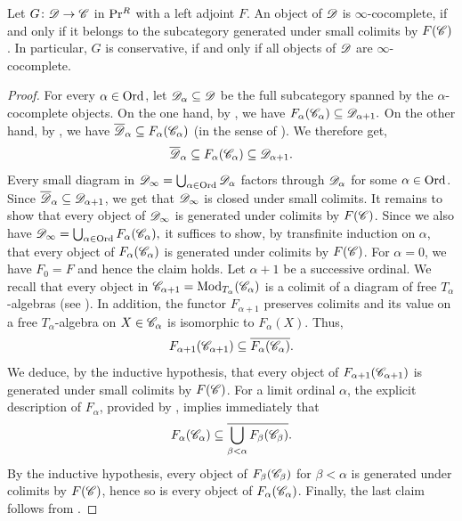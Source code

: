 \documentclass[english]{article}
\begin{document}
\begin{prop}\label{cocomplete_Is_Generated}
    Let $G\colon \mathscr{D} \to \mathscr{C}$ in $\mathrm{Pr}{}^R$ with a left adjoint $F$. An object of $\mathscr{D}$ is $\infty$-cocomplete, if and only if it belongs to the subcategory generated under small colimits by $F(\mathscr{C})$. In particular, $G$ is conservative, if and only if all objects of $\mathscr{D}$ are $\infty$-cocomplete.  
\end{prop}
\begin{proof}
    For every $\alpha \in \mathrm{Ord}$, 
    let $\mathscr{D}_{\alpha} \subseteq \mathscr{D}$ be the full subcategory spanned by the $\alpha$-cocomplete objects.
    On the one hand, by , we have $F_\alpha(\mathscr{C}_\alpha) \subseteq \mathscr{D}_{\alpha+1}.$
    On the other hand, by , we have 
    $\overline{\mathscr{D}}_\alpha \subseteq F_\alpha(\mathscr{C}_\alpha)$ (in the sense of ). 
    We therefore get,
    \[
        \overline{\mathscr{D}}_{\alpha} \subseteq 
        F_{\alpha}(\mathscr{C}_{\alpha}) \subseteq
        \mathscr{D}_{\alpha+1}.
    \]
    Every small diagram in 
    \(
        \mathscr{D}_\infty =
        \bigcup_{\alpha\in\mathrm{Ord}} \mathscr{D}_{\alpha}
    \)
    factors through $\mathscr{D}_\alpha$ for some $\alpha \in \mathrm{Ord}$. Since $\overline{\mathscr{D}}_{\alpha} \subseteq \mathscr{D}_{\alpha+1}$, we get that $\mathscr{D}_\infty$ is closed under small colimits. It remains to show that every object of $\mathscr{D}_\infty$ is generated under colimits by $F(\mathscr{C})$.
    Since we also have 
    \(
        \mathscr{D}_\infty = 
         \bigcup_{\alpha\in\mathrm{Ord}} F_\alpha(\mathscr{C}_\alpha),
    \)
    it suffices to show, by transfinite induction on $\alpha$, that every object of $F_\alpha(\mathscr{C}_\alpha)$ is generated under colimits by $F(\mathscr{C})$.
    For $\alpha=0$, we have $F_0=F$ and hence the claim holds. Let $\alpha+1$ be a successive ordinal. We recall that every object in  $\mathscr{C}_{\alpha+1}=\operatorname{\operatorname{Mod}}_{T_\alpha}(\mathscr{C}_\alpha)$
    is a colimit of a diagram of free $T_\alpha$-algebras (see ). In addition, the functor $F_{\alpha+1}$ preserves colimits and its value on a free $T_\alpha$-algebra on $X\in\mathscr{C}_\alpha$ is isomorphic to $F_\alpha(X)$. Thus,
    \[
        F_{\alpha+1}(\mathscr{C}_{\alpha+1}) \subseteq \overline{F_\alpha(\mathscr{C}_\alpha)}.
    \]
    We deduce, by the inductive hypothesis, that every object of $F_{\alpha+1}(\mathscr{C}_{\alpha+1})$ is generated under small colimits by $F(\mathscr{C})$.
    For a limit ordinal $\alpha$, the explicit description of $F_\alpha$, provided by \cite[Theorem B]{horev2017conjugates}, implies immediately that
    \[
        F_\alpha(\mathscr{C}_\alpha) \subseteq 
        \overline{\bigcup_{\beta<\alpha}F_\beta(\mathscr{C}_\beta)}.
    \]
    By the inductive hypothesis, every object of $F_\beta(\mathscr{C}_\beta)$ for $\beta<\alpha$ is generated under colimits by $F(\mathscr{C})$, hence so is every object of $F_\alpha(\mathscr{C}_\alpha)$. Finally, the last claim follows from .
\end{proof}
\end{document}
